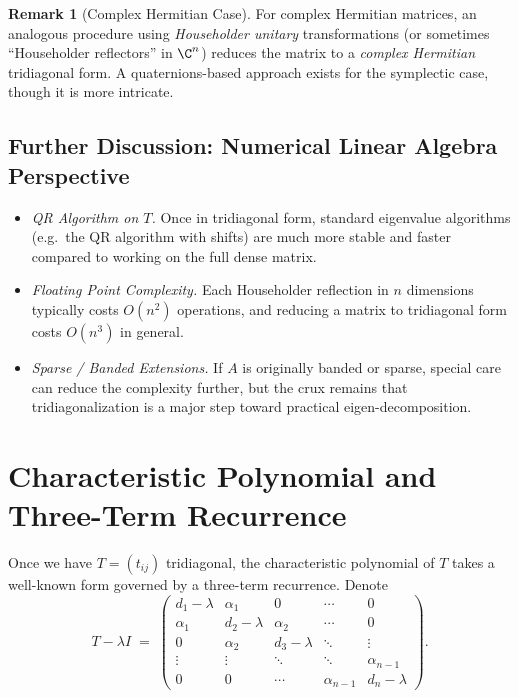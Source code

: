 \documentclass[letterpaper,11pt,oneside,reqno]{article}
\numberwithin{equation}{section}
\theoremstyle{definition}
\newtheorem{remark}[proposition]{Remark}
\begin{document}
\begin{remark}[Complex Hermitian Case]
For complex Hermitian matrices, an analogous procedure using \emph{Householder unitary} transformations (or sometimes “Householder reflectors” in $\C^n$) reduces the matrix to a \emph{complex Hermitian} tridiagonal form. A quaternions-based approach exists for the symplectic case, though it is more intricate.
\end{remark}

\subsection{Further Discussion: Numerical Linear Algebra Perspective}

\begin{itemize}
\item \emph{QR Algorithm on $T$.} Once in tridiagonal form, standard eigenvalue algorithms (e.g.\ the QR algorithm with shifts) are much more stable and faster compared to working on the full dense matrix.
\item \emph{Floating Point Complexity.} Each Householder reflection in $n$ dimensions typically costs $O(n^2)$ operations, and reducing a matrix to tridiagonal form costs $O(n^3)$ in general.
\item \emph{Sparse / Banded Extensions.} If $A$ is originally banded or sparse, special care can reduce the complexity further, but the crux remains that tridiagonalization is a major step toward practical eigen-decomposition.
\end{itemize}

\section{Characteristic Polynomial and Three-Term Recurrence}
\label{sec:3term}

Once we have $T = (t_{ij})$ tridiagonal, the characteristic polynomial of $T$ takes a well-known form governed by a three-term recurrence. Denote
\[
  T - \lambda I \;=\;
  \begin{pmatrix}
    d_1 - \lambda & \alpha_1 & 0 & \cdots & 0 \\
    \alpha_1 & d_2 - \lambda & \alpha_2 & \cdots & 0 \\
    0        & \alpha_2 & d_3 - \lambda & \ddots & \vdots \\
    \vdots   & \vdots   & \ddots & \ddots & \alpha_{n-1} \\
    0        & 0        & \cdots & \alpha_{n-1} & d_n - \lambda
  \end{pmatrix}.
\]
\end{document}
